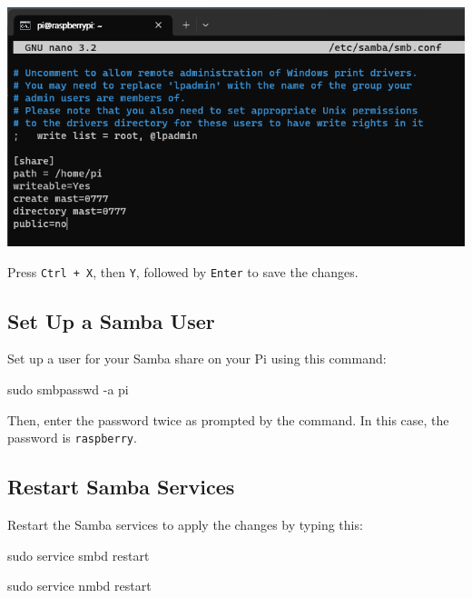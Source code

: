 \documentclass[
  letterpaper,
]{scrbook}
\newenvironment{Shaded}{\begin{snugshade}}{\end{snugshade}}
\newcommand{\AttributeTok}[1]{\textcolor[rgb]{0.40,0.45,0.13}{#1}}
\newcommand{\FunctionTok}[1]{\textcolor[rgb]{0.28,0.35,0.67}{#1}}
\newcommand{\NormalTok}[1]{\textcolor[rgb]{0.00,0.23,0.31}{#1}}
\begin{document}
\includegraphics{content/material/ch2/samba_setting.png}

Press \texttt{Ctrl\ +\ X}, then \texttt{Y}, followed by \texttt{Enter}
to save the changes.

\hypertarget{set-up-a-samba-user}{%
\subsection{Set Up a Samba User}\label{set-up-a-samba-user}}

Set up a user for your Samba share on your Pi using this command:

\begin{Shaded}
\begin{Highlighting}[]
\FunctionTok{sudo}\NormalTok{ smbpasswd }\AttributeTok{{-}a}\NormalTok{ pi}
\end{Highlighting}
\end{Shaded}

Then, enter the password twice as prompted by the command. In this case,
the password is \texttt{raspberry}.

\hypertarget{restart-samba-services}{%
\subsection{Restart Samba Services}\label{restart-samba-services}}

Restart the Samba services to apply the changes by typing this:

\begin{Shaded}
\begin{Highlighting}[]
\FunctionTok{sudo}\NormalTok{ service smbd restart}
\end{Highlighting}
\end{Shaded}

\begin{Shaded}
\begin{Highlighting}[]
\FunctionTok{sudo}\NormalTok{ service nmbd restart}
\end{Highlighting}
\end{Shaded}
\end{document}

